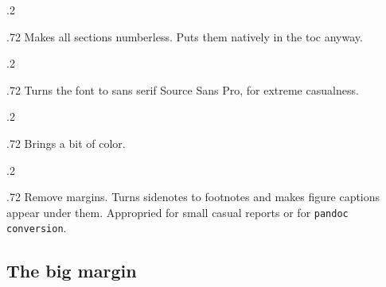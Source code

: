 \documentclass[
	raggedright,
	12pt,
	colorful,
]{tufte-style-article}
\begin{document}
\begin{minipagewithmarginpars}[t]{.2\textwidth}
	\raggedleft
\end{minipagewithmarginpars}\hfill%
\begin{minipagewithmarginpars}[t]{.72\textwidth}
	Makes all sections numberless. Puts them natively in the toc anyway.
\end{minipagewithmarginpars}
\bigskip

\begin{minipagewithmarginpars}[t]{.2\textwidth}
	\raggedleft
\end{minipagewithmarginpars}\hfill%
\begin{minipagewithmarginpars}[t]{.72\textwidth}
	Turns the font to sans serif Source Sans Pro, for extreme casualness.
\end{minipagewithmarginpars}
\bigskip

\begin{minipagewithmarginpars}[t]{.2\textwidth}
	\raggedleft
\end{minipagewithmarginpars}\hfill%
\begin{minipagewithmarginpars}[t]{.72\textwidth}
	Brings a bit of color.
\end{minipagewithmarginpars}
\bigskip

\begin{minipagewithmarginpars}[t]{.2\textwidth}
	\raggedleft
\end{minipagewithmarginpars}\hfill%
\begin{minipagewithmarginpars}[t]{.72\textwidth}
	Remove margins. Turns sidenotes to footnotes and makes figure captions appear under them. Appropried for small casual reports or for \texttt{pandoc conversion}.
\end{minipagewithmarginpars}


\subsection{The big margin}
\end{document}
